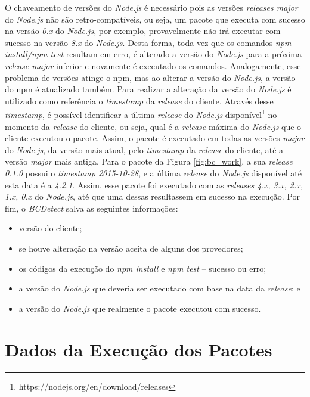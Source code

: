 O chaveamento de versões do \textit{Node.js} é necessário pois as versões \textit{releases major} do \textit{Node.js} não são retro-compatíveis, ou seja, um pacote que executa com sucesso na versão \textit{0.x} do \textit{Node.js}, por exemplo, provavelmente não irá executar com sucesso na versão \textit{8.x} do \textit{Node.js}. Desta forma, toda vez que os comandos \textit{npm install/npm test} resultam em erro, é alterado a versão do \textit{Node.js} para a próxima \textit{release major} inferior e novamente é executado os comandos. Analogamente, esse problema de versões atinge o \gls{npm}, mas ao alterar a versão do \textit{Node.js}, a versão do \gls{npm} é atualizado também. Para realizar a alteração da versão do \textit{Node.js} é utilizado como referência o \textit{timestamp} da \textit{release} do cliente. Através desse \textit{timestamp}, é possível identificar a última \textit{release} do \textit{Node.js} disponível\footnote{https://nodejs.org/en/download/releases} no momento da \textit{release} do cliente, ou seja, qual é a \textit{release} máxima do \textit{Node.js} que o cliente executou o pacote. Assim, o pacote é executado em todas as versões \textit{major} do \textit{Node.js}, da versão mais atual, pelo \textit{timestamp} da \textit{release} do cliente, até a versão \textit{major} mais antiga. Para o pacote da Figura \ref{fig:bc_work}, a sua \textit{release 0.1.0} possui o \textit{timestamp 2015-10-28}, e a última \textit{release} do \textit{Node.js} disponível até esta data é a \textit{4.2.1}. Assim, esse pacote foi executado com as \textit{releases 4.x, 3.x, 2.x, 1.x, 0.x} do \textit{Node.js}, até que uma dessas resultassem em sucesso na execução. Por fim, o \textit{BCDetect} salva as seguintes informações:

\begin{itemize}
    \item versão do cliente;
    \item se houve alteração na versão aceita de alguns dos provedores;
    \item os códigos da execução do \textit{npm install} e \textit{npm test} -- sucesso ou erro;
    \item a versão do \textit{Node.js} que deveria ser executado com base na data da \textit{release}; e
    \item a versão do \textit{Node.js} que realmente o pacote executou com sucesso.
\end{itemize}{}

\section{Dados da Execução dos Pacotes}
\label{sec:col_dados}

